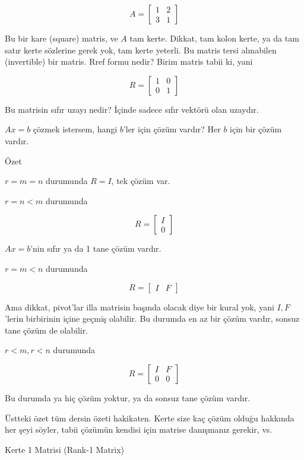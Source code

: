 \documentclass[12pt,fleqn]{article}\usepackage{../../common}
\begin{document}
$$ 
A = 
\left[\begin{array}{rr}
1 & 2 \\ 3 & 1
\end{array}\right]
 $$

Bu bir kare (square) matris, ve $A$ tam kerte. Dikkat, tam kolon kerte, ya
da tam satır kerte sözlerine gerek yok, tam kerte yeterli. Bu matris tersi
alınabilen (invertible) bir matris. Rref formu nedir? Birim matris tabii
ki, yani 

$$ 
R = 
\left[\begin{array}{rr}
1 & 0 \\ 0 & 1
\end{array}\right]
 $$

Bu matrisin sıfır uzayı nedir? İçinde sadece sıfır vektörü olan uzaydır. 

$Ax=b$ çözmek istersem, hangi $b$'ler için çözüm vardır? Her $b$ için bir
çözüm vardır. 

Özet

$r = m = n$ durumunda $R = I$, tek çözüm var. 

$r = n < m$ durumunda 

$$ R = 
\left[\begin{array}{r}
I \\ 0
\end{array}\right]
$$

$Ax=b$'nin sıfır ya da 1 tane çözüm vardır.

$r = m < n$ durumunda 

$$ R = 
\left[\begin{array}{rr}
I &  F
\end{array}\right]
 $$

Ama dikkat, pivot'lar illa matrisin başında olacak diye bir kural yok,
yani $I,F$'lerin birbirinin içine geçmiş olabilir. Bu durumda en az bir
çözüm vardır, sonsuz tane çözüm de olabilir.

$r < m, r<n$ durumunda

$$ 
R = 
\left[\begin{array}{rr}
I & F \\
0 & 0
\end{array}\right]
 $$

Bu durumda ya hiç çözüm yoktur, ya da sonsuz tane çözüm vardır. 

Üstteki özet tüm dersin özeti hakikaten. Kerte size kaç çözüm olduğu
hakkında her şeyi söyler, tabii çözümün kendisi için matrise danışmanız
gerekir, vs.

Kerte 1 Matrisi (Rank-1 Matrix)
\end{document}
